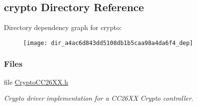 \subsection{crypto Directory Reference}
\label{dir_a4ac6d843dd5108db1b5caa98a4da6f4}
Directory dependency graph for crypto\+:
\nopagebreak
\begin{figure}[H]
\begin{center}
\leavevmode
\texttt{[image: dir\_a4ac6d843dd5108db1b5caa98a4da6f4\_dep]}
\end{center}
\end{figure}
\subsubsection*{Files}
\begin{DoxyCompactItemize}
\item 
file \hyperlink{_crypto_c_c26_x_x_8h}{Crypto\+C\+C26\+X\+X.\+h}
\begin{DoxyCompactList}\small\item\em Crypto driver implementation for a C\+C26\+X\+X Crypto controller. \end{DoxyCompactList}\end{DoxyCompactItemize}
